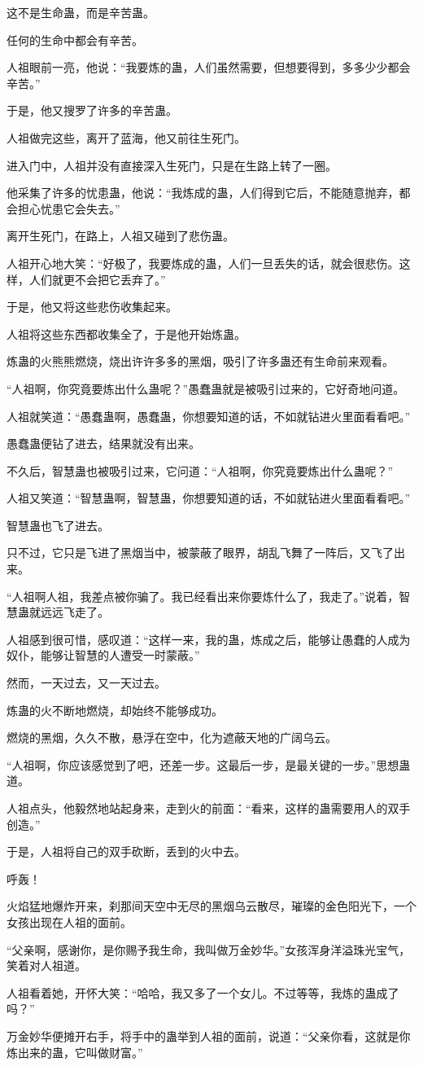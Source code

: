 \begin{this_body}
这不是生命蛊，而是辛苦蛊。

任何的生命中都会有辛苦。

人祖眼前一亮，他说：“我要炼的蛊，人们虽然需要，但想要得到，多多少少都会辛苦。”

于是，他又搜罗了许多的辛苦蛊。

人祖做完这些，离开了蓝海，他又前往生死门。

进入门中，人祖并没有直接深入生死门，只是在生路上转了一圈。

他采集了许多的忧患蛊，他说：“我炼成的蛊，人们得到它后，不能随意抛弃，都会担心忧患它会失去。”

离开生死门，在路上，人祖又碰到了悲伤蛊。

人祖开心地大笑：“好极了，我要炼成的蛊，人们一旦丢失的话，就会很悲伤。这样，人们就更不会把它丢弃了。”

于是，他又将这些悲伤收集起来。

人祖将这些东西都收集全了，于是他开始炼蛊。

炼蛊的火熊熊燃烧，烧出许许多多的黑烟，吸引了许多蛊还有生命前来观看。

“人祖啊，你究竟要炼出什么蛊呢？”愚蠢蛊就是被吸引过来的，它好奇地问道。

人祖就笑道：“愚蠢蛊啊，愚蠢蛊，你想要知道的话，不如就钻进火里面看看吧。”

愚蠢蛊便钻了进去，结果就没有出来。

不久后，智慧蛊也被吸引过来，它问道：“人祖啊，你究竟要炼出什么蛊呢？”

人祖又笑道：“智慧蛊啊，智慧蛊，你想要知道的话，不如就钻进火里面看看吧。”

智慧蛊也飞了进去。

只不过，它只是飞进了黑烟当中，被蒙蔽了眼界，胡乱飞舞了一阵后，又飞了出来。

“人祖啊人祖，我差点被你骗了。我已经看出来你要炼什么了，我走了。”说着，智慧蛊就远远飞走了。

人祖感到很可惜，感叹道：“这样一来，我的蛊，炼成之后，能够让愚蠢的人成为奴仆，能够让智慧的人遭受一时蒙蔽。”

然而，一天过去，又一天过去。

炼蛊的火不断地燃烧，却始终不能够成功。

燃烧的黑烟，久久不散，悬浮在空中，化为遮蔽天地的广阔乌云。

“人祖啊，你应该感觉到了吧，还差一步。这最后一步，是最关键的一步。”思想蛊道。

人祖点头，他毅然地站起身来，走到火的前面：“看来，这样的蛊需要用人的双手创造。”

于是，人祖将自己的双手砍断，丢到的火中去。

呼轰！

火焰猛地爆炸开来，刹那间天空中无尽的黑烟乌云散尽，璀璨的金色阳光下，一个女孩出现在人祖的面前。

“父亲啊，感谢你，是你赐予我生命，我叫做万金妙华。”女孩浑身洋溢珠光宝气，笑着对人祖道。

人祖看着她，开怀大笑：“哈哈，我又多了一个女儿。不过等等，我炼的蛊成了吗？”

万金妙华便摊开右手，将手中的蛊举到人祖的面前，说道：“父亲你看，这就是你炼出来的蛊，它叫做财富。”

\end{this_body}

